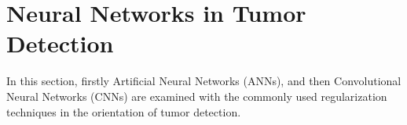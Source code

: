 \chapter{Neural Networks in Tumor Detection}

    In this section, firstly Artificial Neural Networks (ANNs), and then Convolutional Neural Networks (CNNs) are examined
    with the commonly used regularization techniques in the orientation of tumor detection.

    

    

    

